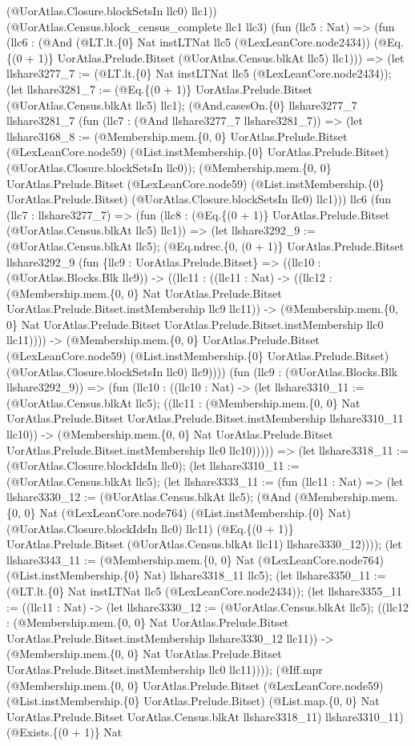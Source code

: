 \documentclass[11pt]{article}
\begin{document}
(@UorAtlas.Closure.blockSetsIn llc0) llc1)) (@UorAtlas.Census.block\_census\_complete llc1 llc3) (fun (llc5 : Nat) => (fun (llc6 : (@And (@LT.lt.\{0\} Nat instLTNat llc5 (@LexLeanCore.node2434)) (@Eq.\{(0 + 1)\} UorAtlas.Prelude.Bitset (@UorAtlas.Census.blkAt llc5) llc1))) => (let llshare3277\_7 := (@LT.lt.\{0\} Nat instLTNat llc5 (@LexLeanCore.node2434)); (let llshare3281\_7 := (@Eq.\{(0 + 1)\} UorAtlas.Prelude.Bitset (@UorAtlas.Census.blkAt llc5) llc1); (@And.casesOn.\{0\} llshare3277\_7 llshare3281\_7 (fun (llc7 : (@And llshare3277\_7 llshare3281\_7)) => (let llshare3168\_8 := (@Membership.mem.\{0, 0\} UorAtlas.Prelude.Bitset (@LexLeanCore.node59) (@List.instMembership.\{0\} UorAtlas.Prelude.Bitset) (@UorAtlas.Closure.blockSetsIn llc0)); (@Membership.mem.\{0, 0\} UorAtlas.Prelude.Bitset (@LexLeanCore.node59) (@List.instMembership.\{0\} UorAtlas.Prelude.Bitset) (@UorAtlas.Closure.blockSetsIn llc0) llc1))) llc6 (fun (llc7 : llshare3277\_7) => (fun (llc8 : (@Eq.\{(0 + 1)\} UorAtlas.Prelude.Bitset (@UorAtlas.Census.blkAt llc5) llc1)) => (let llshare3292\_9 := (@UorAtlas.Census.blkAt llc5); (@Eq.ndrec.\{0, (0 + 1)\} UorAtlas.Prelude.Bitset llshare3292\_9 (fun \{llc9 : UorAtlas.Prelude.Bitset\} => ((llc10 : (@UorAtlas.Blocks.Blk llc9)) -> ((llc11 : ((llc11 : Nat) -> ((llc12 : (@Membership.mem.\{0, 0\} Nat UorAtlas.Prelude.Bitset UorAtlas.Prelude.Bitset.instMembership llc9 llc11)) -> (@Membership.mem.\{0, 0\} Nat UorAtlas.Prelude.Bitset UorAtlas.Prelude.Bitset.instMembership llc0 llc11)))) -> (@Membership.mem.\{0, 0\} UorAtlas.Prelude.Bitset (@LexLeanCore.node59) (@List.instMembership.\{0\} UorAtlas.Prelude.Bitset) (@UorAtlas.Closure.blockSetsIn llc0) llc9)))) (fun (llc9 : (@UorAtlas.Blocks.Blk llshare3292\_9)) => (fun (llc10 : ((llc10 : Nat) -> (let llshare3310\_11 := (@UorAtlas.Census.blkAt llc5); ((llc11 : (@Membership.mem.\{0, 0\} Nat UorAtlas.Prelude.Bitset UorAtlas.Prelude.Bitset.instMembership llshare3310\_11 llc10)) -> (@Membership.mem.\{0, 0\} Nat UorAtlas.Prelude.Bitset UorAtlas.Prelude.Bitset.instMembership llc0 llc10))))) => (let llshare3318\_11 := (@UorAtlas.Closure.blockIdsIn llc0); (let llshare3310\_11 := (@UorAtlas.Census.blkAt llc5); (let llshare3333\_11 := (fun (llc11 : Nat) => (let llshare3330\_12 := (@UorAtlas.Census.blkAt llc5); (@And (@Membership.mem.\{0, 0\} Nat (@LexLeanCore.node764) (@List.instMembership.\{0\} Nat) (@UorAtlas.Closure.blockIdsIn llc0) llc11) (@Eq.\{(0 + 1)\} UorAtlas.Prelude.Bitset (@UorAtlas.Census.blkAt llc11) llshare3330\_12)))); (let llshare3343\_11 := (@Membership.mem.\{0, 0\} Nat (@LexLeanCore.node764) (@List.instMembership.\{0\} Nat) llshare3318\_11 llc5); (let llshare3350\_11 := (@LT.lt.\{0\} Nat instLTNat llc5 (@LexLeanCore.node2434)); (let llshare3355\_11 := ((llc11 : Nat) -> (let llshare3330\_12 := (@UorAtlas.Census.blkAt llc5); ((llc12 : (@Membership.mem.\{0, 0\} Nat UorAtlas.Prelude.Bitset UorAtlas.Prelude.Bitset.instMembership llshare3330\_12 llc11)) -> (@Membership.mem.\{0, 0\} Nat UorAtlas.Prelude.Bitset UorAtlas.Prelude.Bitset.instMembership llc0 llc11)))); (@Iff.mpr (@Membership.mem.\{0, 0\} UorAtlas.Prelude.Bitset (@LexLeanCore.node59) (@List.instMembership.\{0\} UorAtlas.Prelude.Bitset) (@List.map.\{0, 0\} Nat UorAtlas.Prelude.Bitset UorAtlas.Census.blkAt llshare3318\_11) llshare3310\_11) (@Exists.\{(0 + 1)\} Nat 
\end{document}
